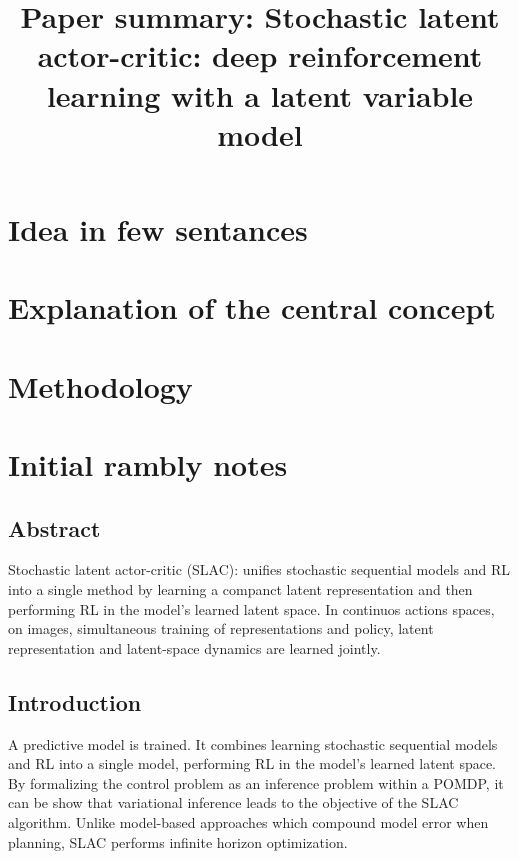 \documentclass{article}
\title{Paper summary: Stochastic latent actor-critic: 
deep reinforcement learning with a latent variable model}
\begin{document}
\maketitle


\section{Idea in few sentances}

\section{Explanation of the central concept}

\section{Methodology}


\section{Initial rambly notes}


\subsection{Abstract}
Stochastic latent actor-critic (SLAC):
unifies stochastic sequential models and RL into a single method
by learning a companct latent representation and then performing RL in the model's learned latent space.
In continuos actions spaces, on images, simultaneous training of representations
and policy, latent representation and latent-space dynamics are learned jointly.

\subsection{Introduction}
A predictive model is trained.
It combines learning stochastic sequential models and RL into a single model,
performing RL in the model's learned latent space.
By formalizing the control problem as an inference problem 
within a POMDP, it can be show that variational inference leads to the objective of
the SLAC algorithm.
Unlike model-based approaches which compound model error when planning, SLAC 
performs infinite horizon optimization.
\end{document}
